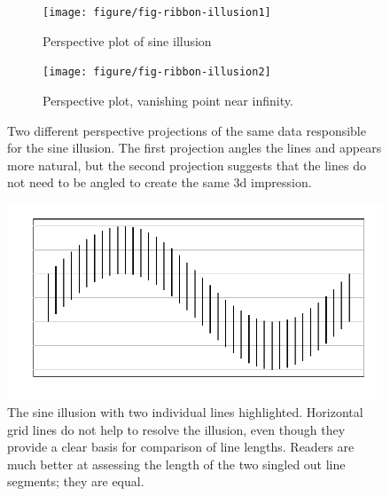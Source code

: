 \documentclass[12pt]{article}\usepackage[]{graphicx}\usepackage[]{color}
\begin{document}


% 

\begin{figure}[h!tbp]\centering

\begin{subfigure}[t]{.45\linewidth}\centering
\texttt{[image: figure/fig-ribbon-illusion1]}
\caption{Perspective plot of sine illusion\label{ribbon1}}
\end{subfigure}
\begin{subfigure}[t]{.54\linewidth}\centering
\texttt{[image: figure/fig-ribbon-illusion2]}
\caption{Perspective plot, vanishing point near infinity.\label{ribbon2}}
\end{subfigure}
\caption{Two different perspective projections of the same data responsible for the sine illusion. The first projection angles the lines and appears more natural, but the second projection suggests that the lines do not need to be angled to create the same 3d impression.\label{ribbon}}
\end{figure}




\begin{figure}
\centering
\caption{\label{fig:original-grid} The sine illusion with two individual lines highlighted. Horizontal grid lines do not help  to resolve the illusion, even though they provide a clear basis for comparison of line lengths. Readers are much better at assessing the length of the two singled out line segments; they are equal.}
\includegraphics[width=.3\linewidth]{figure/fig-originalgrid}
\end{figure}
\end{document}
